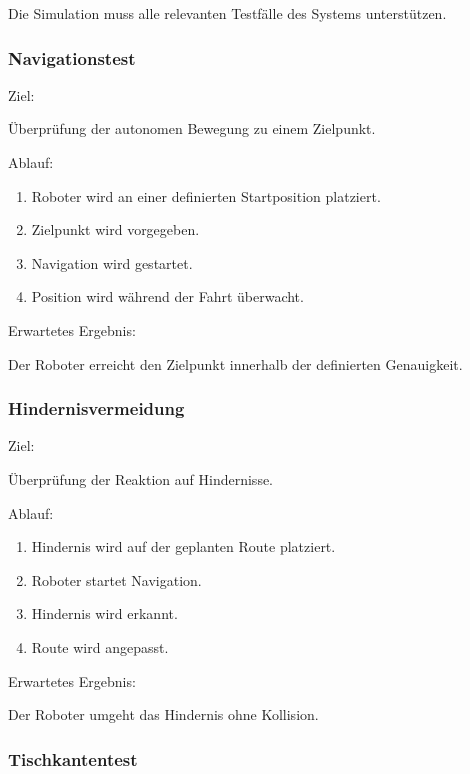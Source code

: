 Die Simulation muss alle relevanten Testfälle des Systems unterstützen.

\subsubsection{Navigationstest}\label{navigationstest}

Ziel:

Überprüfung der autonomen Bewegung zu einem Zielpunkt.

Ablauf:

\begin{enumerate}
\def\labelenumi{\arabic{enumi}.}
\tightlist
\item
  Roboter wird an einer definierten Startposition platziert.
\item
  Zielpunkt wird vorgegeben.
\item
  Navigation wird gestartet.
\item
  Position wird während der Fahrt überwacht.
\end{enumerate}

Erwartetes Ergebnis:

Der Roboter erreicht den Zielpunkt innerhalb der definierten
Genauigkeit.

\subsubsection{Hindernisvermeidung}\label{hindernisvermeidung}

Ziel:

Überprüfung der Reaktion auf Hindernisse.

Ablauf:

\begin{enumerate}
\def\labelenumi{\arabic{enumi}.}
\tightlist
\item
  Hindernis wird auf der geplanten Route platziert.
\item
  Roboter startet Navigation.
\item
  Hindernis wird erkannt.
\item
  Route wird angepasst.
\end{enumerate}

Erwartetes Ergebnis:

Der Roboter umgeht das Hindernis ohne Kollision.

\subsubsection{Tischkantentest}\label{tischkantentest}


